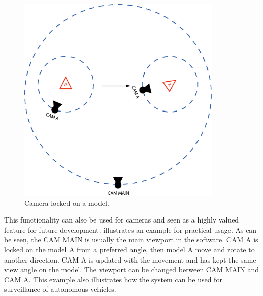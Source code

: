 \begin{figure}[ht]
    \centering
    \includegraphics[height=10cm]{images/cam_ex.png}
    \caption[Camera locked on a model]{Camera locked on a model.}
    \label{fig:cam_ex}
\end{figure}

This functionality can also be used for cameras and seen as a highly valued feature for future development.  illustrates an example for practical usage. As can be seen, the CAM MAIN is usually the main viewport in the software. CAM A is locked on the model A from a preferred angle, then model A move and rotate to another direction. CAM A is updated with the movement and has kept the same view angle on the model. The viewport can be changed between CAM MAIN and CAM A. This example also illustrates how the system can be used for surveillance of autonomous vehicles.